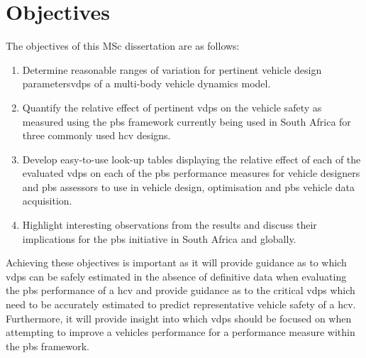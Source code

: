 \chapter{Objectives}\label{section:objectives}

The objectives of this MSc dissertation are as follows:

\begin{enumerate}
\item Determine reasonable ranges of variation for pertinent vehicle design parameters\glspl{vdp} of a multi-body vehicle dynamics model.
\item Quantify the relative effect of pertinent \glspl{vdp} on the vehicle safety as measured using the \gls{pbs} framework currently being used in South Africa for three commonly used \gls{hcv} designs.
\item Develop easy-to-use look-up tables displaying the relative effect of each of the evaluated \glspl{vdp} on each of the \gls{pbs} performance measures for vehicle designers and \gls{pbs} assessors to use in vehicle design, optimisation and \gls{pbs} vehicle data acquisition.
\item Highlight interesting observations from the results and discuss their implications for the \gls{pbs} initiative in South Africa and globally.
\end{enumerate}

Achieving these objectives is important as it will provide guidance as to which \glspl{vdp} can be safely estimated in the absence of definitive data when evaluating the \gls{pbs} performance of a \gls{hcv} and provide guidance as to the critical \glspl{vdp} which need to be accurately estimated to predict representative vehicle safety of a \gls{hcv}. Furthermore, it will provide insight into which \glspl{vdp} should be focused on when attempting to improve a vehicles performance for a performance measure within the \gls{pbs} framework.